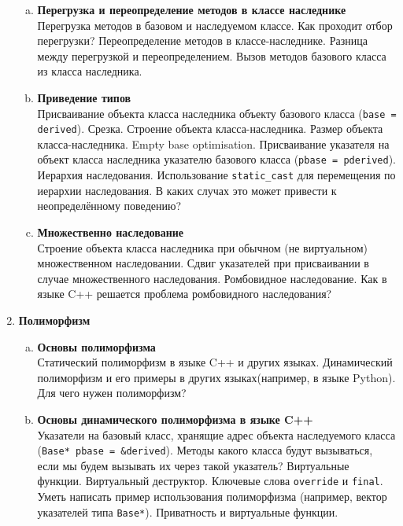 \documentclass{article}
\begin{document}
\begin{enumerate}
\begin{enumerate}[a.]
\item \textbf{Перегрузка и переопределение методов в классе наследнике}\\
Перегрузка методов в базовом и наследуемом классе. Как проходит отбор перегрузки? Переопределение  методов в классе-наследнике. Разница между перегрузкой и переопределением. Вызов методов базового класса из класса наследника.

\item \textbf{Приведение типов}\\
Присваивание объекта класса наследника объекту базового класса (\texttt{base = derived}). Срезка.
Строение объекта класса-наследника. Размер объекта класса-наследника. Empty base optimisation. Присваивание указателя на объект класса наследника указателю базового класса (\texttt{pbase = pderived}).
Иерархия наследования. Использование \texttt{static\_cast} для перемещения по иерархии наследования. В каких случах это может привести к неопределённому поведению?


\item \textbf{Множественно наследование}\\
Строение объекта класса наследника при обычном (не виртуальном) множественном наследовании.
Сдвиг указателей при присваивании в случае множественного наследования. Ромбовидное наследование. Как в языке C++ решается проблема ромбовидного наследования?
\end{enumerate}




\item \textbf{Полиморфизм}
\begin{enumerate}[a.]


\item \textbf{Основы полиморфизма}\\
Статический полиморфизм в языке C++ и других языках. Динамический полиморфизм и его примеры в других языках(например, в языке Python). Для чего нужен полиморфизм? 


\item \textbf{Основы динамического полиморфизма в языке C++}\\
Указатели на базовый класс, хранящие адрес объекта наследуемого класса (\texttt{Base* pbase = \&derived}). Методы какого класса будут вызываться, если мы будем вызывать их через такой указатель?  Виртуальные функции. Виртуальный деструктор. Ключевые слова \texttt{override} и \texttt{final}. Уметь написать пример использования полиморфизма (например, вектор указателей типа \texttt{Base*}). Приватность и виртуальные функции.


\end{enumerate}
\end{enumerate}
\end{document}
